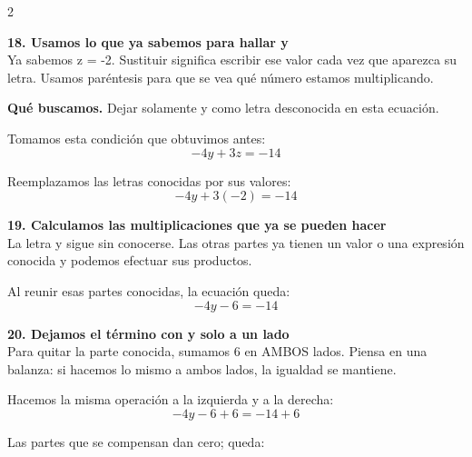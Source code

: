 \documentclass[11pt,a4paper,landscape]{article}
\begin{document}
\begin{multicols*}{2}
\begin{minipage}{\linewidth}
\end{minipage}\par\medskip
\noindent\begin{minipage}{\linewidth}\textbf{18. Usamos lo que ya sabemos para hallar y}\\[2pt]Ya sabemos z = -2. Sustituir significa escribir ese valor cada vez que aparezca su letra. Usamos paréntesis para que se vea qué número estamos multiplicando.
\par\smallskip\textbf{Qué buscamos.} Dejar solamente y como letra desconocida en esta ecuación.
\par\smallskip Tomamos esta condición que obtuvimos antes:
\[-4y + 3z = -14\]
\par\smallskip Reemplazamos las letras conocidas por sus valores:
\[-4y + 3\left(-2\right)=-14\]
\end{minipage}\par\medskip
\noindent\begin{minipage}{\linewidth}\textbf{19. Calculamos las multiplicaciones que ya se pueden hacer}\\[2pt]La letra y sigue sin conocerse. Las otras partes ya tienen un valor o una expresión conocida y podemos efectuar sus productos.
\par{}\par\smallskip
\par\smallskip Al reunir esas partes conocidas, la ecuación queda:
\[-4y - 6=-14\]
\end{minipage}\par\medskip
\noindent\begin{minipage}{\linewidth}\textbf{20. Dejamos el término con y solo a un lado}\\[2pt]Para quitar la parte conocida, sumamos 6 en AMBOS lados. Piensa en una balanza: si hacemos lo mismo a ambos lados, la igualdad se mantiene.
\par\smallskip Hacemos la misma operación a la izquierda y a la derecha:
\[-4y - 6 + 6=-14 + 6\]
\par\smallskip Las partes que se compensan dan cero; queda:

\end{minipage}
\end{multicols*}
\end{document}

